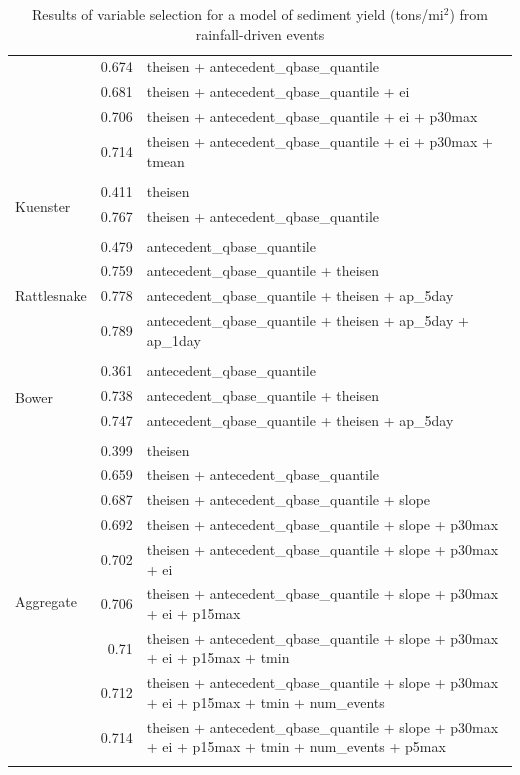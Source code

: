 \documentclass[10pt]{article}
\begin{document}
\begin{table}[h]
\begin{center}
\begin{tabular}{lrl}
 & 0.674 & theisen + antecedent\_qbase\_quantile\\ 
 & 0.681 & theisen + antecedent\_qbase\_quantile + ei\\ 
 & 0.706 & theisen + antecedent\_qbase\_quantile + ei + p30max\\ 
 & 0.714 & theisen + antecedent\_qbase\_quantile + ei + p30max + tmean\\ 
\vspace{2mm}\\ \multirow{3}{*}{Kuenster} & 0.411 & theisen\\ 
 & 0.767 & theisen + antecedent\_qbase\_quantile\\ 
\vspace{2mm}\\ \multirow{5}{*}{Rattlesnake} & 0.479 & antecedent\_qbase\_quantile\\ 
 & 0.759 & antecedent\_qbase\_quantile + theisen\\ 
 & 0.778 & antecedent\_qbase\_quantile + theisen + ap\_5day\\ 
 & 0.789 & antecedent\_qbase\_quantile + theisen + ap\_5day + ap\_1day\\ 
\vspace{2mm}\\ \multirow{4}{*}{Bower} & 0.361 & antecedent\_qbase\_quantile\\ 
 & 0.738 & antecedent\_qbase\_quantile + theisen\\ 
 & 0.747 & antecedent\_qbase\_quantile + theisen + ap\_5day\\ 
\vspace{2mm}\\ \multirow{10}{*}{Aggregate} & 0.399 & theisen\\ 
 & 0.659 & theisen + antecedent\_qbase\_quantile\\ 
 & 0.687 & theisen + antecedent\_qbase\_quantile + slope\\ 
 & 0.692 & theisen + antecedent\_qbase\_quantile + slope + p30max\\ 
 & 0.702 & theisen + antecedent\_qbase\_quantile + slope + p30max + ei\\ 
 & 0.706 & theisen + antecedent\_qbase\_quantile + slope + p30max + ei + p15max\\ 
 & 0.71 & theisen + antecedent\_qbase\_quantile + slope + p30max + ei + p15max + tmin\\ 
 & 0.712 & theisen + antecedent\_qbase\_quantile + slope + p30max + ei + p15max + tmin + num\_events\\ 
 & 0.714 & theisen + antecedent\_qbase\_quantile + slope + p30max + ei + p15max + tmin + num\_events + p5max\\ 
\vspace{2mm}\\     \end{tabular}
    \caption{Results of variable selection for a model of sediment yield (tons/$\text{mi}^2$) from rainfall-driven events\label{sed_r_square_nosnow}}
    \end{center}
\end{table}
\end{document}
